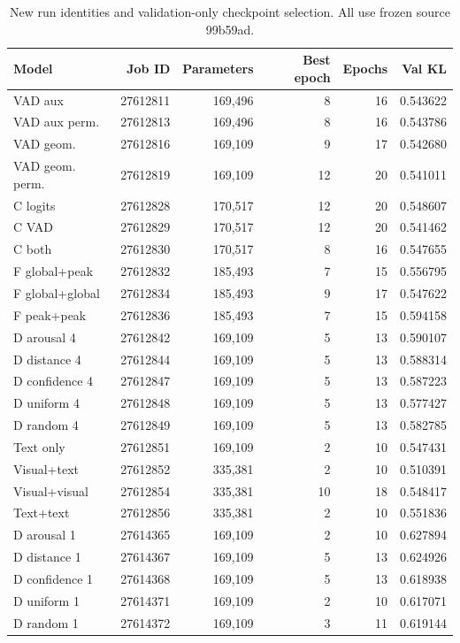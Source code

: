 \begingroup\footnotesize\setlength{\tabcolsep}{4pt}
\begin{longtable}{lrrrrr}
\caption{New run identities and validation-only checkpoint selection. All use frozen source 99b59ad.}\\
\toprule
Model & Job ID & Parameters & Best epoch & Epochs & Val KL\\\midrule\endhead
VAD aux & 27612811 & 169,496 & 8 & 16 & 0.543622\\
VAD aux perm. & 27612813 & 169,496 & 8 & 16 & 0.543786\\
VAD geom. & 27612816 & 169,109 & 9 & 17 & 0.542680\\
VAD geom. perm. & 27612819 & 169,109 & 12 & 20 & 0.541011\\
C logits & 27612828 & 170,517 & 12 & 20 & 0.548607\\
C VAD & 27612829 & 170,517 & 12 & 20 & 0.541462\\
C both & 27612830 & 170,517 & 8 & 16 & 0.547655\\
F global+peak & 27612832 & 185,493 & 7 & 15 & 0.556795\\
F global+global & 27612834 & 185,493 & 9 & 17 & 0.547622\\
F peak+peak & 27612836 & 185,493 & 7 & 15 & 0.594158\\
D arousal 4 & 27612842 & 169,109 & 5 & 13 & 0.590107\\
D distance 4 & 27612844 & 169,109 & 5 & 13 & 0.588314\\
D confidence 4 & 27612847 & 169,109 & 5 & 13 & 0.587223\\
D uniform 4 & 27612848 & 169,109 & 5 & 13 & 0.577427\\
D random 4 & 27612849 & 169,109 & 5 & 13 & 0.582785\\
Text only & 27612851 & 169,109 & 2 & 10 & 0.547431\\
Visual+text & 27612852 & 335,381 & 2 & 10 & 0.510391\\
Visual+visual & 27612854 & 335,381 & 10 & 18 & 0.548417\\
Text+text & 27612856 & 335,381 & 2 & 10 & 0.551836\\
D arousal 1 & 27614365 & 169,109 & 2 & 10 & 0.627894\\
D distance 1 & 27614367 & 169,109 & 5 & 13 & 0.624926\\
D confidence 1 & 27614368 & 169,109 & 5 & 13 & 0.618938\\
D uniform 1 & 27614371 & 169,109 & 2 & 10 & 0.617071\\
D random 1 & 27614372 & 169,109 & 3 & 11 & 0.619144\\

\end{longtable}
